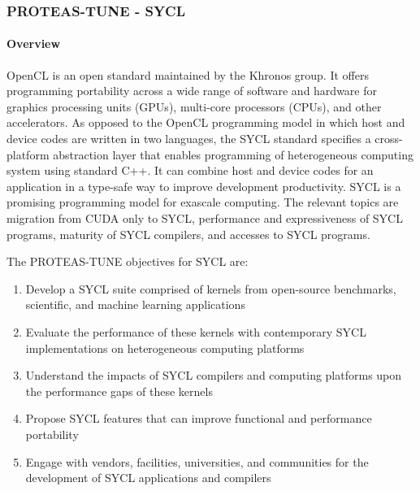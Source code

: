 \subsubsection{ PROTEAS-TUNE - SYCL}\label{s:sycl}

\paragraph{Overview}
OpenCL is an open standard maintained by the Khronos group. It offers programming portability across a wide range of software and hardware for graphics processing units (GPUs), multi-core processors (CPUs), and other accelerators. As opposed to the OpenCL programming model in which host and device codes are written in two languages, the SYCL standard specifies a cross-platform abstraction layer that enables programming of heterogeneous computing system using standard C++. It can combine host and device codes for an application in a type-safe way to improve development productivity. SYCL is a promising programming model for exascale computing. The relevant topics are migration from CUDA only to SYCL, performance and expressiveness of SYCL programs, maturity of SYCL compilers, and accesses to SYCL programs.


The PROTEAS-TUNE objectives for SYCL are:
\begin{enumerate}
\item Develop a SYCL suite comprised of kernels from open-source benchmarks, scientific, and machine learning applications
\item Evaluate the performance of these kernels with contemporary SYCL implementations on heterogeneous computing platforms
\item Understand the impacts of SYCL compilers and computing platforms upon the performance gaps of these kernels
\item Propose SYCL features that can improve functional and performance portability 
\item Engage with vendors, facilities, universities, and communities for the development of SYCL applications and compilers
\end{enumerate}

 

